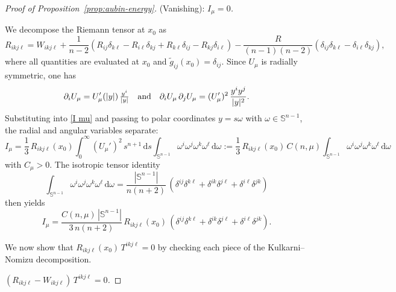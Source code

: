 \documentclass[reqno,11pt]{amsart}
\numberwithin{equation}{section}
\theoremstyle{definition}
\theoremstyle{remark}
\newcommand{\ud}{\,\mathrm{d}}
\newcommand{\Ss}{\mathbb{S}}
\begin{document}
\begin{proof}[Proof of Proposition~\ref{prop:aubin-energy}]
\medskip
{} {\rm (Vanishing):}  {\it $I_\mu = 0$.}

\smallskip
{} We decompose the Riemann tensor at $x_0$ as
\[
R_{ikj\ell} = W_{ikj\ell} + \frac{1}{n-2}\left(R_{ij}\delta_{k\ell} - R_{i\ell}\delta_{kj} + R_{k\ell}\delta_{ij} - R_{kj}\delta_{i\ell}\right) - \frac{R}{(n-1)(n-2)}\left(\delta_{ij}\delta_{k\ell} - \delta_{i\ell}\delta_{kj}\right),
\]
where all quantities are evaluated at $x_0$ and $\tilde{g}_{ij}(x_0) = \delta_{ij}$. Since $U_\mu$ is radially symmetric, one has 
\[
\partial_i U_\mu = U_\mu'(|y|)\, \tfrac{y^i}{|y|} \quad {\rm and} \quad 
\partial_i U_\mu\,\partial_j U_\mu = (U_\mu')^2\, \frac{y^i y^j}{|y|^2}.
\]
Substituting into \eqref{I mu} and passing to polar coordinates $y = s\omega$ with $\omega \in \Ss^{n-1}$, the radial and angular variables separate:
\[
I_\mu = \frac{1}{3}\, R_{ikj\ell}(x_0) \int_0^\infty (U_\mu')^2\, s^{n+1} \ud s \int_{\Ss^{n-1}} \omega^i \omega^j \omega^k \omega^\ell \ud \omega:=\frac{1}{3}\, R_{ikj\ell}(x_0) \, C(n,\mu) \int_{\Ss^{n-1}} \omega^i \omega^j \omega^k \omega^\ell \ud \omega
\]
with $C_{\mu}>0$.
The isotropic tensor identity
\begin{equation}\label{eq:angular-average}
\int_{\Ss^{n-1}} \omega^i \omega^j \omega^k \omega^\ell \ud \omega = \frac{|\Ss^{n-1}|}{n(n+2)}\,\left(\delta^{ij}\delta^{k\ell} + \delta^{ik}\delta^{j\ell} + \delta^{i\ell}\delta^{jk}\right)
\end{equation}
then yields
\[
I_\mu = \frac{C(n,\mu)\,|\Ss^{n-1}|}{3\,n(n+2)}\, R_{ikj\ell}(x_0)\,\left(\delta^{ij}\delta^{k\ell} + \delta^{ik}\delta^{j\ell} + \delta^{i\ell}\delta^{jk}\right).
\]

We now show that $R_{ikj\ell}(x_0)\,T^{ikj\ell} = 0$ by checking each piece of the Kulkarni--Nomizu decomposition.

\smallskip
{} {\it $(R_{ikj\ell} - W_{ikj\ell})\,T^{ikj\ell} = 0$.}


\end{proof}
\end{document}
